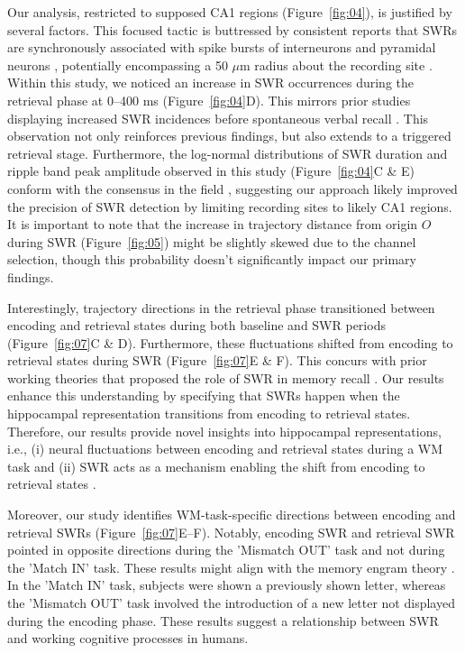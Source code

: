 \documentclass[final,3p,times,twocolumn]{elsarticle}
\begin{document}
Our analysis, restricted to supposed CA1 regions (Figure~\ref{fig:04}), is justified by several factors. This focused tactic is buttressed by consistent reports that SWRs are synchronously associated with spike bursts of interneurons and pyramidal neurons \cite{buzsaki_two-stage_1989,quyen_cell_2008,royer_control_2012,hajos_input-output_2013}, potentially encompassing a 50 $\mu$m radius about the recording site \cite{schomburg_spiking_2012}. Within this study, we noticed an increase in SWR occurrences during the retrieval phase at 0--400 ms (Figure~\ref{fig:04}D). This mirrors prior studies displaying increased SWR incidences before spontaneous verbal recall \cite{norman_hippocampal_2019, norman_hippocampal_2021}. This observation not only reinforces previous findings, but also extends to a triggered retrieval stage. Furthermore, the log-normal distributions of SWR duration and ripple band peak amplitude observed in this study (Figure~\ref{fig:04}C \& E) conform with the consensus in the field \cite{liu_consensus_2022}, suggesting our approach likely improved the precision of SWR detection by limiting recording sites to likely CA1 regions. It is important to note that the increase in trajectory distance from origin $O$ during SWR (Figure~\ref{fig:05}) might be slightly skewed due to the channel selection, though this probability doesn't significantly impact our primary findings.

Interestingly, trajectory directions in the retrieval phase transitioned between encoding and retrieval states during both baseline and SWR periods (Figure~\ref{fig:07}C \& D). Furthermore, these fluctuations shifted from encoding to retrieval states during SWR (Figure~\ref{fig:07}E \& F). This concurs with prior working theories that proposed the role of SWR in memory recall \cite{norman_hippocampal_2019, norman_hippocampal_2021}. Our results enhance this understanding by specifying that SWRs happen when the hippocampal representation transitions from encoding to retrieval states. Therefore, our results provide novel insights into hippocampal representations, i.e., (i) neural fluctuations between encoding and retrieval states during a WM task and (ii) SWR acts as a mechanism enabling the shift from encoding to retrieval states \cite{buzsaki_hippocampal_2015}.

Moreover, our study identifies WM-task-specific directions between encoding and retrieval SWRs (Figure~\ref{fig:07}E--F). Notably, encoding SWR and retrieval SWR pointed in opposite directions during the 'Mismatch OUT' task and not during the 'Match IN' task. These results might align with the memory engram theory \cite{liu_optogenetic_2012}. In the 'Match IN' task, subjects were shown a previously shown letter, whereas the 'Mismatch OUT' task involved the introduction of a new letter not displayed during the encoding phase. These results suggest a relationship between SWR and working cognitive processes in humans.
\end{document}

